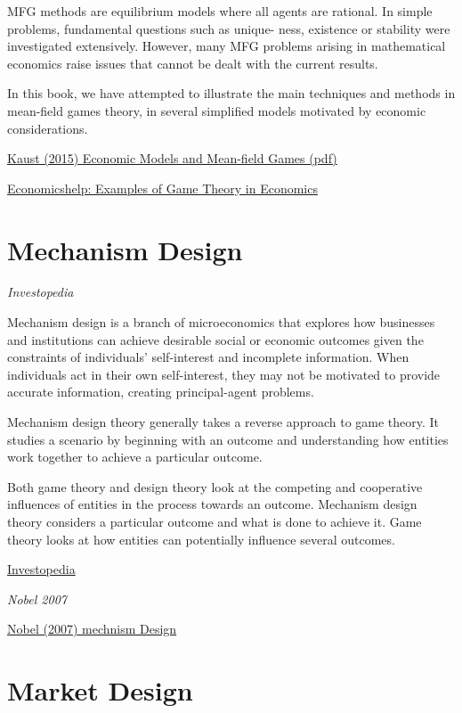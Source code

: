 \documentclass[
]{book}
\begin{document}
MFG methods are equilibrium models where all agents are
rational. In simple problems, fundamental questions such as unique-
ness, existence or stability were investigated extensively. However,
many MFG problems arising in mathematical economics raise issues
that cannot be dealt with the current results.

In this book, we have attempted to illustrate the main techniques
and methods in mean-field games theory, in several simplified models
motivated by economic considerations.

\href{pdf/Kaust_2015_Mean-field_Games.pdf}{Kaust (2015) Economic Models and Mean-field Games (pdf)}

\href{https://www.economicshelp.org/university/game-theory/}{Economicshelp: Examples of Game Theory in Economics}

\hypertarget{mechanism-design}{%
\section{Mechanism Design}\label{mechanism-design}}

\emph{Investopedia}

Mechanism design is a branch of microeconomics that explores how businesses and institutions can achieve desirable social or economic outcomes given the constraints of individuals' self-interest and incomplete information. When individuals act in their own self-interest, they may not be motivated to provide accurate information, creating principal-agent problems.

Mechanism design theory generally takes a reverse approach to game theory. It studies a scenario by beginning with an outcome and understanding how entities work together to achieve a particular outcome.

Both game theory and design theory look at the competing and cooperative influences of entities in the process towards an outcome. Mechanism design theory considers a particular outcome and what is done to achieve it. Game theory looks at how entities can potentially influence several outcomes.

\href{https://www.investopedia.com/terms/m/mechanism-design-theory.asp\#citation-1}{Investopedia}

\emph{Nobel 2007}

\href{pdf/Nobel_2007_Mechanism_Design.pdf}{Nobel (2007) mechnism Design}

\hypertarget{market-design}{%
\section{Market Design}\label{market-design}}
\end{document}
